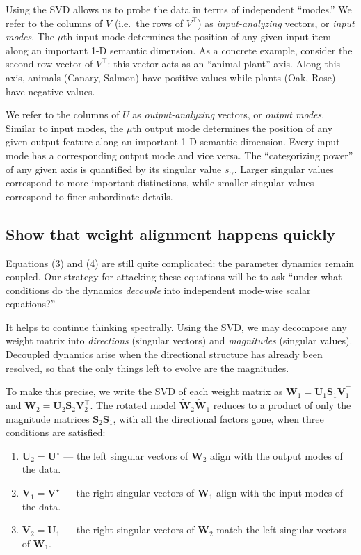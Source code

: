\documentclass[12pt]{article}
\newcommand{\mW}{\mathbf{W}}
\newcommand{\mU}{\mathbf{U}}
\newcommand{\mV}{\mathbf{V}}
\newcommand{\mS}{\mathbf{S}}
\begin{document}
Using the SVD allows us to probe the data in terms of independent ``modes.'' We refer to the columns of $V$ (i.e.\ the rows of $V^\top$) as \emph{input-analyzing} vectors, or \emph{input modes}. The $\mu$th input mode determines the position of any given input item along an important 1-D semantic dimension. As a concrete example, consider the second row vector of $V^\top$: this vector acts as an ``animal-plant'' axis. Along this axis, animals (Canary, Salmon) have positive values while plants (Oak, Rose) have negative values.

We refer to the columns of $U$ as \emph{output-analyzing} vectors, or \emph{output modes}. Similar to input modes, the $\mu$th output mode determines the position of any given output feature along an important 1-D semantic dimension. Every input mode has a corresponding output mode and vice versa. The ``categorizing power'' of any given axis is quantified by its singular value $s_\alpha$. Larger singular values correspond to more important distinctions, while smaller singular values correspond to finer subordinate details.

\subsection{Show that weight alignment happens quickly}

Equations (3) and (4) are still quite complicated: the parameter dynamics remain coupled. Our strategy for attacking these equations will be to ask ``under what conditions do the dynamics \emph{decouple} into independent mode-wise scalar equations?''

It helps to continue thinking spectrally. Using the SVD, we may decompose any weight matrix into \emph{directions} (singular vectors) and \emph{magnitudes} (singular values). Decoupled dynamics arise when the directional structure has already been resolved, so that the only things left to evolve are the magnitudes.

To make this precise, we write the SVD of each weight matrix as $\mW_1 = \mU_1 \mS_1 \mV_1^\top$ and $\mW_2 = \mU_2 \mS_2 \mV_2^\top$. The rotated model $\tilde{\mW}_2 \tilde{\mW}_1$ reduces to a product of only the magnitude matrices $\mS_2 \mS_1$, with all the directional factors gone, when three conditions are satisfied:

\begin{enumerate}
    \item $\mU_2 = \mU^\star$ --- the left singular vectors of $\mW_2$ align with the output modes of the data.
    \item $\mV_1 = \mV^\star$ --- the right singular vectors of $\mW_1$ align with the input modes of the data.
    \item $\mV_2 = \mU_1$ --- the right singular vectors of $\mW_2$ match the left singular vectors of $\mW_1$.
\end{enumerate}
\end{document}
